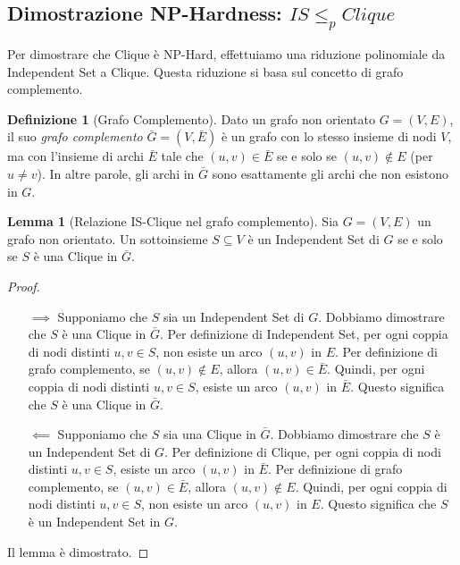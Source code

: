 \documentclass[a4paper]{article}
\theoremstyle{definition} %
\newtheorem{definition}{Definizione}[section]
\newtheorem{lemma}{Lemma}[section]
\theoremstyle{definition} %
\begin{document}
\subsection{Dimostrazione NP-Hardness: $IS \le_p Clique$}

Per dimostrare che Clique è NP-Hard, effettuiamo una riduzione polinomiale da Independent Set a Clique. Questa riduzione si basa sul concetto di grafo complemento.

\begin{definition}[Grafo Complemento]
Dato un grafo non orientato $G=(V, E)$, il suo \emph{grafo complemento} $\bar{G}=(V, \bar{E})$ è un grafo con lo stesso insieme di nodi $V$, ma con l'insieme di archi $\bar{E}$ tale che $(u, v) \in \bar{E}$ se e solo se $(u, v) \notin E$ (per $u \ne v$). In altre parole, gli archi in $\bar{G}$ sono esattamente gli archi che non esistono in $G$.
\end{definition}

\begin{lemma}[Relazione IS-Clique nel grafo complemento]
Sia $G=(V, E)$ un grafo non orientato. Un sottoinsieme $S \subseteq V$ è un Independent Set di $G$ se e solo se $S$ è una Clique in $\bar{G}$.
\end{lemma}

\begin{proof}
\begin{itemize}
    \item[$\implies$] Supponiamo che $S$ sia un Independent Set di $G$.
    Dobbiamo dimostrare che $S$ è una Clique in $\bar{G}$.
    Per definizione di Independent Set, per ogni coppia di nodi distinti $u, v \in S$, non esiste un arco $(u, v)$ in $E$.
    Per definizione di grafo complemento, se $(u, v) \notin E$, allora $(u, v) \in \bar{E}$.
    Quindi, per ogni coppia di nodi distinti $u, v \in S$, esiste un arco $(u, v)$ in $\bar{E}$. Questo significa che $S$ è una Clique in $\bar{G}$.

    \item[$\impliedby$] Supponiamo che $S$ sia una Clique in $\bar{G}$.
    Dobbiamo dimostrare che $S$ è un Independent Set di $G$.
    Per definizione di Clique, per ogni coppia di nodi distinti $u, v \in S$, esiste un arco $(u, v)$ in $\bar{E}$.
    Per definizione di grafo complemento, se $(u, v) \in \bar{E}$, allora $(u, v) \notin E$.
    Quindi, per ogni coppia di nodi distinti $u, v \in S$, non esiste un arco $(u, v)$ in $E$. Questo significa che $S$ è un Independent Set in $G$.
\end{itemize}
Il lemma è dimostrato.
\end{proof}
\end{document}
